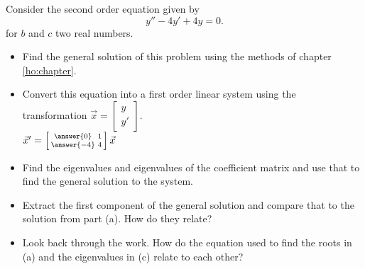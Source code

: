 \documentclass{ximera}
\begin{document}
\begin{exercise}
    Consider the second order equation given by
    \begin{equation*}
        y'' - 4y' + 4y = 0.
    \end{equation*} for $b$ and $c$ two real numbers.
    \begin{itemize}
        \item Find the general solution of this problem using the methods of chapter \ref{ho:chapter}.
        \item Convert this equation into a first order linear system using the transformation $\vec{x} = \left[ \begin{smallmatrix} y \\ y' \end{smallmatrix} \right]$. \\
            ${\vec{x}}' = \left[\begin{smallmatrix} \answer{0} & 1 \\ \answer{-4} & 4 \end{smallmatrix}\right]\vec{x}$
        \item Find the eigenvalues and eigenvalues of the coefficient matrix and use that to find the general solution to the system.
        \item Extract the first component of the general solution and compare that to the solution from part (a). How do they relate?
        \item Look back through the work. How do the equation used to find the roots in (a) and the eigenvalues in (c) relate to each other?
    \end{itemize}
\end{exercise}
\end{document}
